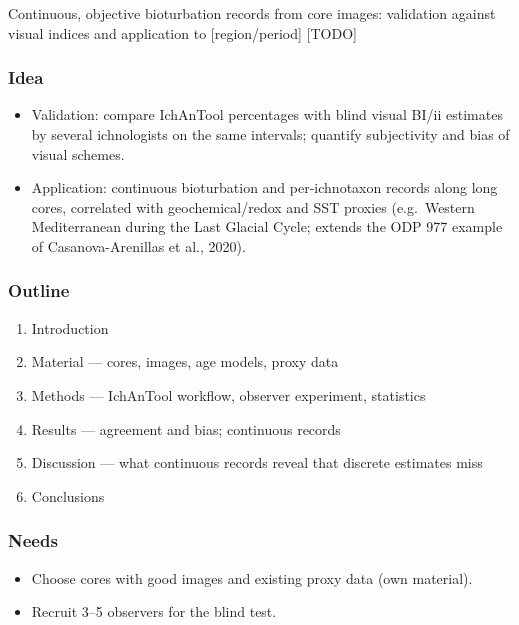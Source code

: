 \documentclass[
  10pt,
]{article}
\providecommand{\tightlist}{%
  \setlength{\itemsep}{0pt}\setlength{\parskip}{0pt}}
\begin{document}
Continuous, objective bioturbation records from core images: validation
against visual indices and application to {[}region/period{]} {[}TODO{]}

\hypertarget{idea}{%
\subsubsection{Idea}\label{idea}}

\begin{itemize}
\tightlist
\item
  Validation: compare IchAnTool percentages with blind visual BI/ii
  estimates by several ichnologists on the same intervals; quantify
  subjectivity and bias of visual schemes.
\item
  Application: continuous bioturbation and per-ichnotaxon records along
  long cores, correlated with geochemical/redox and SST proxies
  (e.g.~Western Mediterranean during the Last Glacial Cycle; extends the
  ODP 977 example of Casanova-Arenillas et al., 2020).
\end{itemize}

\hypertarget{outline}{%
\subsubsection{Outline}\label{outline}}

\begin{enumerate}
\def\labelenumi{\arabic{enumi}.}
\tightlist
\item
  Introduction
\item
  Material --- cores, images, age models, proxy data
\item
  Methods --- IchAnTool workflow, observer experiment, statistics
\item
  Results --- agreement and bias; continuous records
\item
  Discussion --- what continuous records reveal that discrete estimates
  miss
\item
  Conclusions
\end{enumerate}

\hypertarget{needs-1}{%
\subsubsection{Needs}\label{needs-1}}

\begin{itemize}
\tightlist
\item[$\square$]
  Choose cores with good images and existing proxy data (own material).
\item[$\square$]
  Recruit 3--5 observers for the blind test.
\end{itemize}
\end{document}
